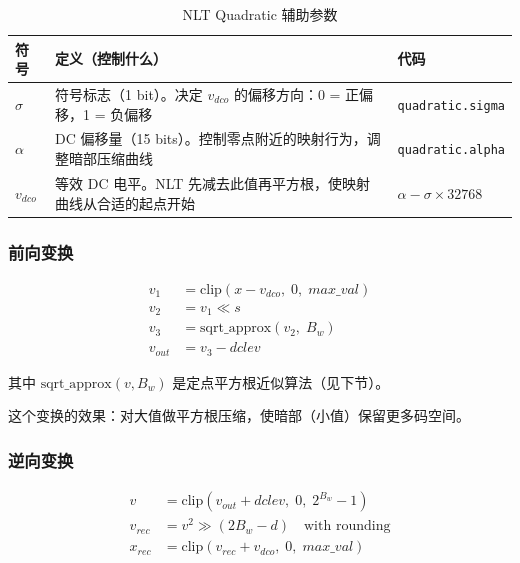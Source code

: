 \begin{table}[H]
\centering
\caption{NLT Quadratic 辅助参数}
\label{tab:nlt-quad-params}
\begin{tabular}{@{}lp{3.5cm}l@{}}
\toprule
符号 & 定义（控制什么） & 代码 \\
\midrule
$\sigma$ & 符号标志（1 bit）。决定 $v_{\mathit{dco}}$ 的偏移方向：0 = 正偏移，1 = 负偏移 & \texttt{quadratic.sigma} \\
$\alpha$ & DC 偏移量（15 bits）。控制零点附近的映射行为，调整暗部压缩曲线 & \texttt{quadratic.alpha} \\
$v_{\mathit{dco}}$ & 等效 DC 电平。NLT 先减去此值再平方根，使映射曲线从合适的起点开始 & $\alpha - \sigma \times 32768$ \\
\bottomrule
\end{tabular}
\end{table}

\subsubsection{前向变换}

\begin{align}
v_1 &= \mathrm{clip}(x - v_{\mathit{dco}},\; 0,\; \mathit{max\_val}) \label{eq:nlt-q-v1} \\
v_2 &= v_1 \ll s \label{eq:nlt-q-v2} \\
v_3 &= \mathrm{sqrt\_approx}(v_2,\; B_w) \label{eq:nlt-q-v3} \\
v_{\mathit{out}} &= v_3 - \mathit{dclev} \label{eq:nlt-q-out}
\end{align}

其中 $\mathrm{sqrt\_approx}(v, B_w)$ 是定点平方根近似算法（见下节）。

这个变换的效果：对大值做平方根压缩，使暗部（小值）保留更多码空间。

\subsubsection{逆向变换}

\begin{align}
v &= \mathrm{clip}(v_{\mathit{out}} + \mathit{dclev},\; 0,\; 2^{B_w} - 1) \label{eq:nlt-q-inv-v} \\
v_{\mathit{rec}} &= v^2 \gg (2B_w - d) \quad \text{with rounding} \label{eq:nlt-q-inv-vrec} \\
x_{\mathit{rec}} &= \mathrm{clip}(v_{\mathit{rec}} + v_{\mathit{dco}},\; 0,\; \mathit{max\_val}) \label{eq:nlt-q-inv-x}
\end{align}

